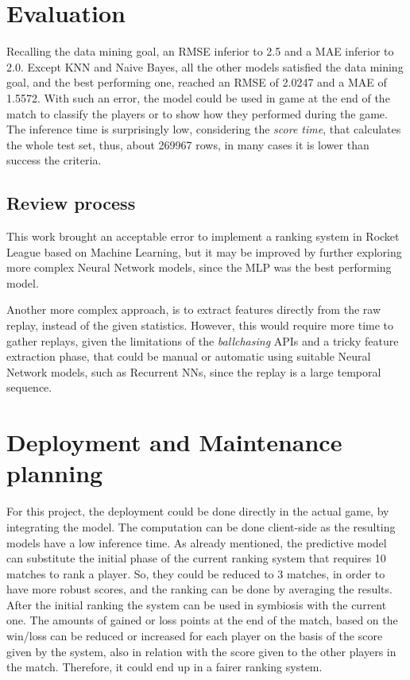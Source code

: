 \section{Evaluation}

Recalling the data mining goal, an RMSE inferior to 2.5 and a MAE inferior to 2.0. Except KNN and Naive Bayes, all the other models satisfied the data mining goal, and the best performing one, reached an RMSE of 2.0247 and a MAE of 1.5572. With such an error, the model could be used in game at the end of the match to classify the players or to show how they performed during the game.
The inference time is surprisingly low, considering the \textit{score time}, that calculates the whole test set, thus, about 269967 rows, in many cases it is lower than success the criteria.

\subsection{Review process}

This work brought an acceptable error to implement a ranking system in Rocket League based on Machine Learning, but it may be improved by further exploring more complex Neural Network models, since the MLP was the best performing model.

Another more complex approach, is to extract features directly from the raw replay, instead of the given statistics. However, this would require more time to gather replays, given the limitations of the \textit{ballchasing} APIs and a tricky feature extraction phase, that could be manual or automatic using suitable Neural Network models, such as Recurrent NNs, since the replay is a large temporal sequence.


\section{Deployment and Maintenance planning}

For this project, the deployment could be done directly in the actual game, by integrating the model. The computation can be done client-side as the resulting models have a low inference time. As already mentioned, the predictive model can substitute the initial phase of the current ranking system that requires 10 matches to rank a player. So, they could be reduced to 3 matches, in order to have more robust scores, and the ranking can be done by averaging the results. After the initial ranking the system can be used in symbiosis with the current one. The amounts of gained or loss points at the end of the match, based on the win/loss can be reduced or increased for each player on the basis of the score given by the system, also in relation with the score given to the other players in the match. Therefore, it could end up in a fairer ranking system.

